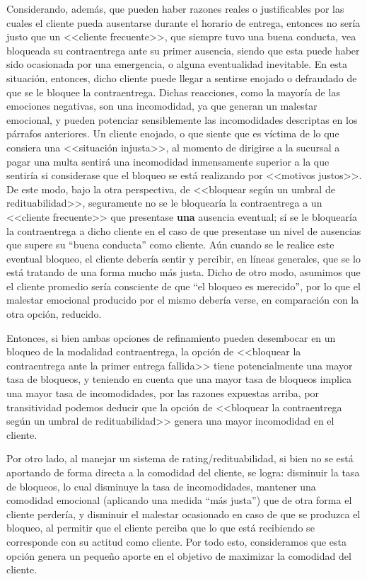 Considerando, además, que pueden haber razones reales o justificables por las
cuales el cliente pueda ausentarse durante el horario de entrega, entonces no
sería justo que un <<cliente frecuente>>, que siempre tuvo una buena conducta,
vea bloqueada su contraentrega ante su primer ausencia, siendo que esta puede
haber sido ocasionada por una emergencia, o alguna eventualidad inevitable. En
esta situación, entonces, dicho cliente puede llegar a sentirse enojado o
defraudado de que se le bloquee la contraentrega. Dichas reacciones, como la
mayoría de las emociones negativas, son una incomodidad, ya que generan un
malestar emocional, y pueden potenciar sensiblemente las incomodidades
descriptas en los párrafos anteriores. Un cliente enojado, o que siente que es
víctima de lo que consiera una <<situación injusta>>, al momento de dirigirse
a la sucursal a pagar una multa sentirá una incomodidad inmensamente superior
a la que sentiría si considerase que el bloqueo se está realizando por
<<motivos justos>>. De este modo, bajo la otra perspectiva, de <<bloquear
según un umbral de redituabilidad>>, seguramente no se le bloquearía la
contraentrega a un <<cliente frecuente>> que presentase \textbf{una} ausencia
eventual; sí se le bloquearía la contraentrega a dicho cliente en el caso de
que presentase un nivel de ausencias que supere su ``buena conducta'' como
cliente. Aún cuando se le realice este eventual bloqueo, el cliente debería
sentir y percibir, en líneas generales, que se lo está tratando de una forma
mucho más justa. Dicho de otro modo, asumimos que el cliente promedio sería
consciente de que ``el bloqueo es merecido'', por lo que el malestar emocional
producido por el mismo debería verse, en comparación con la otra opción,
reducido.

Entonces, si bien ambas opciones de refinamiento pueden desembocar en un
bloqueo de la modalidad contraentrega, la opción de <<bloquear la
contraentrega ante la primer entrega fallida>> tiene potencialmente una mayor
tasa de bloqueos, y teniendo en cuenta que una mayor tasa de bloqueos implica
una mayor tasa de incomodidades, por las razones expuestas arriba, por
transitividad podemos deducir que la opción de <<bloquear la contraentrega
según un umbral de redituabilidad>> genera una mayor incomodidad en el
cliente. 

Por otro lado, al manejar un sistema de rating/redituabilidad, si bien no se
está aportando de forma directa a la comodidad del cliente, se logra:
disminuir la tasa de bloqueos, lo cual disminuye la tasa de incomodidades,
mantener una comodidad emocional (aplicando una medida ``más justa'') que de
otra forma el cliente perdería, y disminuir el malestar ocasionado en caso de
que se produzca el bloqueo, al permitir que el cliente perciba que lo que está
recibiendo se corresponde con su actitud como cliente. Por todo esto,
consideramos que esta opción genera un pequeño aporte en el objetivo de
maximizar la comodidad del cliente.
